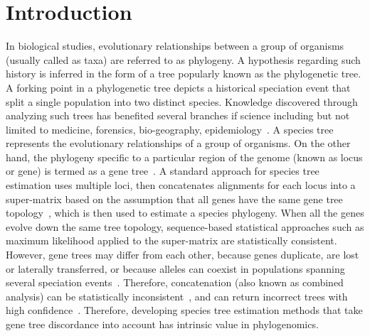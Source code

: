 \section{Introduction}
\label{sec:intro}
In biological studies, evolutionary relationships between a group of organisms (usually called as taxa) are referred to as phylogeny. A hypothesis regarding such history is inferred in the form of a tree popularly known as the phylogenetic tree. A forking point in a phylogenetic tree depicts a historical speciation event that split a single population into two distinct species.  Knowledge discovered through analyzing such trees has benefited several branches if science including but not limited to medicine, forensics, bio-geography, epidemiology~\cite{felix2015phylogenetics}. 
A species tree represents the evolutionary relationships of a group of organisms. On the other hand, the phylogeny specific to a particular region of the genome (known as locus or gene) is termed as a gene tree~\cite{maddison1997gene}. A standard approach for species tree estimation uses multiple loci, then concatenates alignments for each locus
into a super-matrix based on the assumption that all genes have the same gene tree topology~\cite{huelsenbeck1996combining, de2007supermatrix}, which is then used to estimate a species phylogeny. When all the genes evolve down the same tree topology,  sequence-based statistical approaches such as maximum likelihood applied to the super-matrix are statistically consistent. 
However, gene trees may differ from each other, because genes duplicate, are lost or laterally transferred, or because alleles can coexist in populations spanning several speciation events~\cite{maddison1997gene}.
Therefore, concatenation (also known as combined analysis) can be statistically inconsistent~\cite{roch2015likelihood}, and can return incorrect trees with high confidence~\cite{kubatko-degnan-2007,edwards2007,leache-rannala,degiorgio2009}. Therefore, developing species tree estimation methods that take gene tree discordance into account has intrinsic value in phylogenomics.




